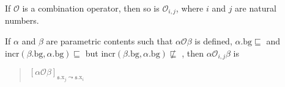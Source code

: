 \begin{ex} 
If $\mathcal{O}$ is a combination operator, then so is
$\mathcal{O}_{i,j}$, where $i$ and $j$ are natural numbers.

If
$\alpha$ and $\beta$ are parametric contents such that
$\alpha\mathcal{O}\beta$ is defined, $\alpha.\text{bg}\sqsubseteq$
and $\mathrm{incr}(\beta.\text{bg},\alpha.\text{bg})\sqsubseteq$
but $\mathrm{incr}(\beta.\text{bg},\alpha.\text{bg})\not\sqsubseteq$
,
then $\alpha\mathcal{O}_{i,j}\beta$ is
\begin{quote}
  $[\alpha\mathcal{O}\beta]_{\mathfrak{s}.\text{x}_j\leadsto\mathfrak{s}.\text{x}_i}$
\end{quote}

    
    



\label{ex:combine-align}

\end{ex} 
